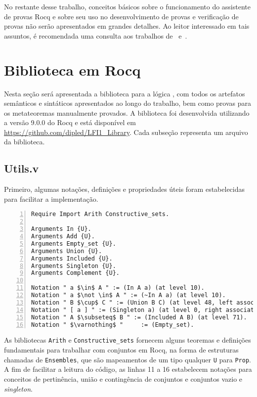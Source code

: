     No restante desse trabalho, conceitos básicos sobre o funcionamento do assistente de provas Rocq e sobre seu uso no desenvolvimento de provas e verificação de provas não serão apresentados em grandes detalhes. Ao leitor interessado em tais assuntos, é recomendada uma consulta aos trabalhos de~ e~.

\section{Biblioteca em Rocq}\label{sec:biblioteca}
    Nesta seção será apresentada a biblioteca para a lógica \lfium{}, com todos os artefatos semânticos e sintáticos apresentados ao longo do trabalho, bem como provas para os metateoremas manualmente provados. A biblioteca foi desenvolvida utilizando a versão 9.0.0 do Rocq e está disponível em \url{https://github.com/dipled/LFI1_Library}. Cada subseção representa um arquivo da biblioteca.

    \subsection{Utils.v}\label{sec:utils}

      Primeiro, algumas notações, definições e propriedades úteis foram estabelecidas para facilitar a implementação.

      \begin{lstlisting}[name=Utils, numbers=left, frame=single, language=coq]
Require Import Arith Constructive_sets.

Arguments In {U}.
Arguments Add {U}.
Arguments Empty_set {U}.
Arguments Union {U}.
Arguments Included {U}.
Arguments Singleton {U}.
Arguments Complement {U}.

Notation " a $\in$ A " := (In A a) (at level 10).
Notation " a $\not \in$ A " := (~In A a) (at level 10).
Notation " B $\cup$ C " := (Union B C) (at level 48, left associativity).
Notation " [ a ] " := (Singleton a) (at level 0, right associativity).
Notation " A $\subseteq$ B " := (Included A B) (at level 71). 
Notation " $\varnothing$ "     := (Empty_set).
      \end{lstlisting}

      As bibliotecas \texttt{Arith} e \texttt{Constructive\_sets} fornecem alguns teoremas e definições fundamentais para trabalhar com conjuntos em Rocq, na forma de estruturas chamadas de \texttt{Ensembles}, que são mapeamentos de um tipo qualquer \texttt{U} para \texttt{Prop}. A fim de facilitar a leitura do código, as linhas 11 a 16 estabelecem notações para conceitos de pertinência, união e contingência de conjuntos e conjuntos vazio e \textit{singleton}.


